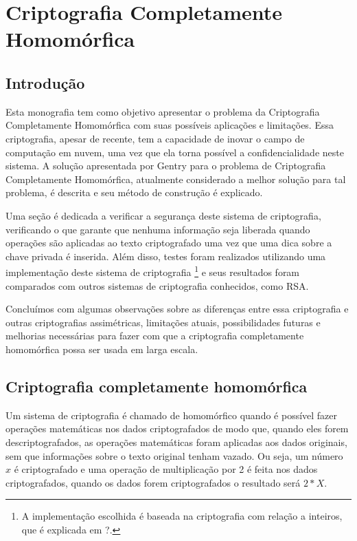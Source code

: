 \chapter{Criptografia Completamente Homomórfica}\label{chp:LABEL_CHP_1}

\section{Introdução}\label{sec:LABEL_CHP_1_SEC_A}
Esta monografia tem como objetivo apresentar o problema da Criptografia Completamente Homomórfica com suas possíveis aplicações e limitações.
Essa criptografia, apesar de recente, tem a capacidade de inovar o campo de computação em nuvem, uma vez que ela torna possível a confidencialidade neste sistema.
A solução apresentada por Gentry para o problema de Criptografia Completamente Homomórfica, atualmente considerado a melhor solução para tal problema, é descrita e seu método de construção é explicado.

Uma seção é dedicada a verificar a segurança deste sistema de criptografia, verificando o que garante que nenhuma informação seja liberada quando operações são aplicadas ao texto criptografado uma vez que uma dica sobre a chave privada é inserida.
Além disso, testes foram realizados utilizando uma implementação deste sistema de criptografia \footnote{A implementação escolhida é baseada na criptografia com relação a inteiros, que é explicada em ?.} e seus resultados foram comparados com outros sistemas de criptografia conhecidos, como RSA.

Concluímos com algumas observações sobre as diferenças entre essa criptografia e outras criptografias assimétricas, limitações atuais, possibilidades futuras e melhorias necessárias para fazer com que a criptografia completamente homomórfica possa ser usada em larga escala. 

\section{Criptografia completamente homomórfica}\label{sec:LABEL_CHP_1_SEC_B}
Um sistema de criptografia é chamado de homomórfico quando é possível fazer operações matemáticas nos dados criptografados de modo que, quando eles forem descriptografados, as operações matemáticas foram aplicadas aos dados originais, sem que informações sobre o texto original tenham vazado.
Ou seja, um número \(x\) é criptografado e uma operação de multiplicação por 2 é feita nos dados criptografados, quando os dados forem criptografados o resultado será \(2*X\).

